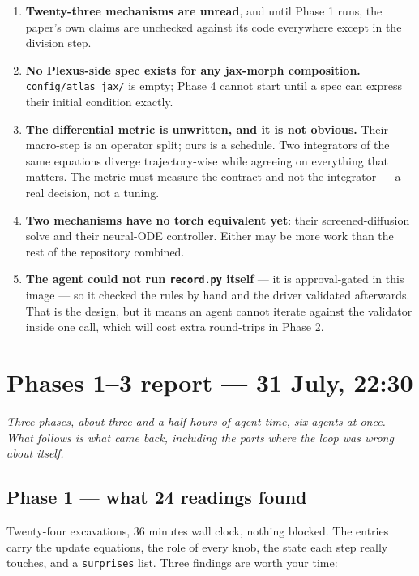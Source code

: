 \documentclass[11pt,a4paper]{article}
\newcommand{\code}[1]{\texttt{#1}}
\begin{document}
\begin{enumerate}[leftmargin=1.4em]
\item \textbf{Twenty-three mechanisms are unread}, and until Phase 1 runs, the paper's own claims
are unchecked against its code everywhere except in the division step.
\item \textbf{No Plexus-side spec exists for any jax-morph composition.} \code{config/atlas_jax/} is
empty; Phase 4 cannot start until a spec can express their initial condition exactly.
\item \textbf{The differential metric is unwritten, and it is not obvious.} Their macro-step is an
operator split; ours is a schedule. Two integrators of the same equations diverge trajectory-wise
while agreeing on everything that matters. The metric must measure the contract and not the
integrator --- a real decision, not a tuning.
\item \textbf{Two mechanisms have no torch equivalent yet}: their screened-diffusion solve and
their neural-ODE controller. Either may be more work than the rest of the repository combined.
\item \textbf{The agent could not run \code{record.py} itself} --- it is approval-gated in this
image --- so it checked the rules by hand and the driver validated afterwards. That is the design,
but it means an agent cannot iterate against the validator inside one call, which will cost extra
round-trips in Phase 2.
\end{enumerate}

\section{Phases 1--3 report --- 31 July, 22:30}\label{sec:p13report}

\emph{Three phases, about three and a half hours of agent time, six agents at once. What follows
is what came back, including the parts where the loop was wrong about itself.}

\subsection{Phase 1 --- what 24 readings found}

Twenty-four excavations, 36 minutes wall clock, nothing blocked. The entries carry the update
equations, the role of every knob, the state each step really touches, and a \code{surprises}
list. Three findings are worth your time:
\end{document}
